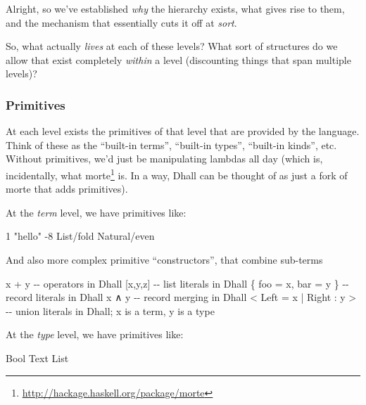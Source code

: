 \documentclass[]{article}
\newenvironment{Shaded}{}{}
\newcommand{\NormalTok}[1]{#1}
\renewcommand{\href}[2]{#2\footnote{\url{#1}}}
\begin{document}
Alright, so we've established \emph{why} the hierarchy exists, what gives rise
to them, and the mechanism that essentially cuts it off at \emph{sort}.

So, what actually \emph{lives} at each of these levels? What sort of structures
do we allow that exist completely \emph{within} a level (discounting things that
span multiple levels)?

\subsubsection{Primitives}\label{primitives}

At each level exists the primitives of that level that are provided by the
language. Think of these as the ``built-in terms'', ``built-in types'',
``built-in kinds'', etc. Without primitives, we'd just be manipulating lambdas
all day (which is, incidentally, what
\href{http://hackage.haskell.org/package/morte}{morte} is. In a way, Dhall can
be thought of as just a fork of morte that adds primitives).

At the \emph{term} level, we have primitives like:

\begin{Shaded}
\begin{Highlighting}[]
\NormalTok{1}
\NormalTok{"hello"}
\NormalTok{{-}8}
\NormalTok{List/fold}
\NormalTok{Natural/even}
\end{Highlighting}
\end{Shaded}

And also more complex primitive ``constructors'', that combine sub-terms

\begin{Shaded}
\begin{Highlighting}[]
\NormalTok{x + y                       {-}{-} operators in Dhall}
\NormalTok{[x,y,z]                     {-}{-} list literals in Dhall}
\NormalTok{\{ foo = x, bar = y \}        {-}{-} record literals in Dhall}
\NormalTok{x ∧ y                       {-}{-} record merging in Dhall}
\NormalTok{\textless{} Left = x | Right : y \textgreater{}    {-}{-} union literals in Dhall; x is a term, y is a type}
\end{Highlighting}
\end{Shaded}

At the \emph{type} level, we have primitives like:

\begin{Shaded}
\begin{Highlighting}[]
\NormalTok{Bool}
\NormalTok{Text}
\NormalTok{List}
\end{Highlighting}
\end{Shaded}
\end{document}
